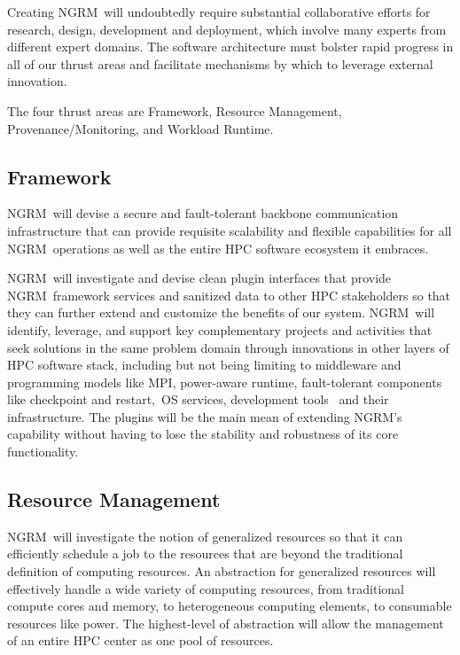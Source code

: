 \documentclass{article}
\newcommand{\ngrm}{NGRM}
\begin{document}
Creating \ngrm\ will undoubtedly
require substantial collaborative efforts for research, design, development
and deployment, which involve many experts from different expert domains.
The software architecture must bolster rapid progress in all of our thrust
areas and facilitate mechanisms by which to leverage external innovation.

The four thrust areas are
Framework,
Resource Management,
Provenance/Monitoring,
and Workload Runtime.

\subsection{Framework}
\ngrm\ will devise a secure and fault-tolerant backbone communication
infrastructure that can provide requisite scalability and flexible
capabilities for all \ngrm\ operations as well as the entire HPC
software ecosystem it embraces.

\ngrm\ will investigate and devise clean plugin interfaces that
provide \ngrm\ framework services and sanitized data to other HPC
stakeholders so that they can further extend and customize the benefits
of our system. \ngrm\ will identify, leverage, and support key complementary
projects and activities that seek solutions in the same problem domain
through innovations in other layers of HPC software stack, including but
not being limiting to middleware and programming models like MPI,
power-aware runtime, fault-tolerant components like checkpoint and
restart, OS services, development tools  and their infrastructure.
The plugins will be the main mean of extending \ngrm’s capability
without having to lose the stability and robustness of its core
functionality.

\subsection{Resource Management}

\ngrm\ will investigate the notion of generalized resources so that
it can efficiently schedule a job to the resources that are beyond the
traditional definition of computing resources. An abstraction for
generalized resources will effectively handle a wide variety of computing
resources, from traditional compute cores and memory, to heterogeneous
computing elements, to consumable resources like power.
The highest-level of abstraction will allow the management of an
entire HPC center as one pool of resources.
\end{document}
